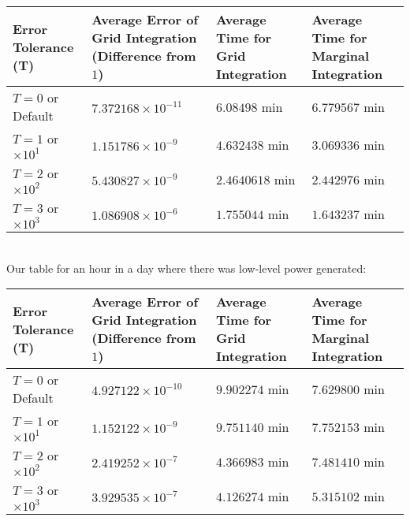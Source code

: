 \begin{tabular}{|p{3cm}||p{3cm}|p{3cm}|p{3cm}|}
\hline
Error Tolerance (T) & Average Error of Grid Integration (Difference from $1$) & Average Time for Grid Integration & Average Time for Marginal Integration\\
\hline
$T = 0$ or Default & $7.372168 \times 10^{-11}$ &$6.08498$ min &$ 6.779567$ min\\
$T=1$ or $ \times 10^{1}$ & $1.151786\times 10^{-9}$ & $4.632438$ min & $3.069336$ min\\
$T=2$ or $\times10^{2}$ & $5.430827 \times 10^{-9}$ & $2.4640618$ min & $2.442976$ min\\
$T=3$ or $\times10^{3}$ & $1.086908 \times 10^{-6}$ & $1.755044$ min & $1.643237$ min\\
\hline
\end{tabular}
\\

Our table for an hour in a day where there was low-level power generated: \\

\begin{tabular}{|p{3cm}||p{3cm}|p{3cm}|p{3cm}|}
\hline
Error Tolerance (T) & Average Error of Grid Integration (Difference from $1$) & Average Time for Grid Integration & Average Time for Marginal Integration\\
\hline
$T = 0$ or Default & $ 4.927122\times 10^{-10}$ &$9.902274$ min &$7.629800 $ min\\
$T=1$ or $ \times 10^{1}$ & $1.152122 \times 10^{-9}$ & $9.751140$ min & $7.752153$ min\\
$T=2$ or $\times10^{2}$ & $2.419252 \times 10^{-7}$ & $4.366983$ min & $7.481410$ min\\
$T=3$ or $\times10^{3}$ & $3.929535 \times 10^{-7}$ & $4.126274$ min & $5.315102$ min\\
\hline
\end{tabular}